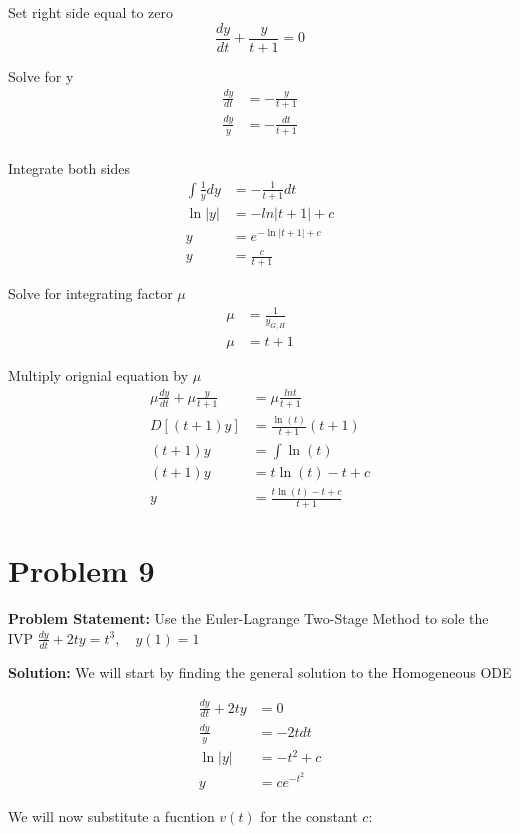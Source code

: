\documentclass[12pt, letterpaper]{article}
\begin{document}
Set right side equal to zero
\[
\frac{dy}{dt} + \frac{y}{t+1} = 0
\]

Solve for y
\begin{align*}
\frac{dy}{dt} &= -\frac{y}{t+1} \\
\frac{dy}{y} &= -\frac{dt}{t+1} \\
\end{align*}

Integrate both sides
\begin{align*}
\int \frac{1}{y} dy &= -\frac{1}{t+1} dt \\
\ln|y| &= -ln|t+1| + c \\
y &= e^{-\ln|t+1| + c} \\
y&= \frac{c}{t+1}
\end{align*}

Solve for integrating factor $\mu$
\begin{align*}
\mu &= \frac{1}{y_{G,H}} \\
\mu &= t+1
\end{align*}


Multiply orignial equation by $\mu$
\begin{align*}
\mu \frac{dy}{dt} + \mu \frac{y}{t+1} &= \mu \frac{lnt}{t+1} \\
D[(t+1)y] &= \frac{\ln(t)}{t+1}(t+1) \\
(t+1)y &= \int \ln(t) \\
(t+1)y &= t\ln(t) - t + c \\
y &= \frac{t\ln(t) - t + c}{t+1}
\end{align*}

\section*{Problem 9}

\textbf{Problem Statement:} Use the Euler-Lagrange Two-Stage Method to sole the IVP $\frac{dy}{dt} + 2ty = t^3, \quad y(1) = 1$

\textbf{Solution:} We will start by finding the general solution to the Homogeneous ODE

\begin{align*}
\frac{dy}{dt} + 2ty &= 0 \\
\frac{dy}{y} &= -2tdt \\
\ln|y| &= -t^2 + c \\
y &= ce^{-t^2}
\end{align*}

We will now substitute a fucntion $v(t)$ for the constant $c$:
\end{document}
